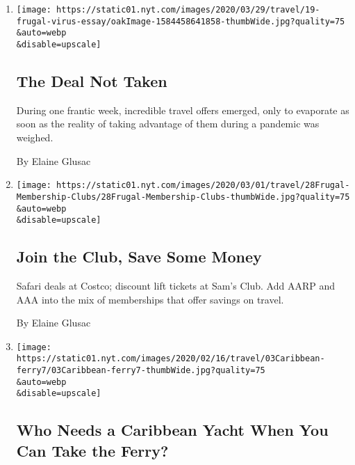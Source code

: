\begin{enumerate}
\def\labelenumi{\arabic{enumi}.}
\item
  \href{/2020/03/21/travel/budget-travel-coronavirus.html}{}

  \texttt{[image: https://static01.nyt.com/images/2020/03/29/travel/19-frugal-virus-essay/oakImage-1584458641858-thumbWide.jpg?quality=75\\\&auto=webp\\\&disable=upscale]}

  \hypertarget{the-deal-not-taken}{%
  \subsection{The Deal Not Taken}\label{the-deal-not-taken}}

  During one frantic week, incredible travel offers emerged, only to
  evaporate as soon as the reality of taking advantage of them during a
  pandemic was weighed.

  By Elaine Glusac
\item
  \href{/2020/02/29/travel/membership-clubs-budget-travel.html}{}

  \texttt{[image: https://static01.nyt.com/images/2020/03/01/travel/28Frugal-Membership-Clubs/28Frugal-Membership-Clubs-thumbWide.jpg?quality=75\\\&auto=webp\\\&disable=upscale]}

  \hypertarget{join-the-club-save-some-money}{%
  \subsection{Join the Club, Save Some
  Money}\label{join-the-club-save-some-money}}

  Safari deals at Costco; discount lift tickets at Sam's Club. Add AARP
  and AAA into the mix of memberships that offer savings on travel.

  By Elaine Glusac
\item
  \href{/2020/02/10/travel/Caribbean-British-Virgin-Islands-Ferry.html}{}

  \texttt{[image: https://static01.nyt.com/images/2020/02/16/travel/03Caribbean-ferry7/03Caribbean-ferry7-thumbWide.jpg?quality=75\\\&auto=webp\\\&disable=upscale]}

  \hypertarget{who-needs-a-caribbean-yacht-when-you-can-take-the-ferry}{%
  \subsection{Who Needs a Caribbean Yacht When You Can Take the
  Ferry?}\label{who-needs-a-caribbean-yacht-when-you-can-take-the-ferry}}


\end{enumerate}
